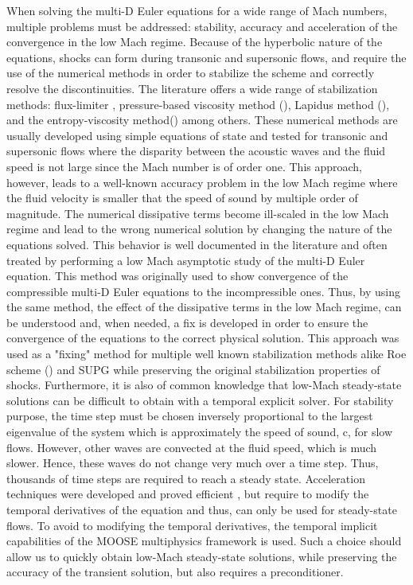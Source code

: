 When solving the multi-D Euler equations for a wide range of Mach numbers, multiple problems must be addressed: stability, accuracy and acceleration of the convergence in the low Mach regime. Because of the hyperbolic nature of the equations, shocks can form during transonic and supersonic flows, and require the use of the numerical methods in order to stabilize the scheme and correctly resolve the discontinuities. The literature offers a wide range of stabilization methods: flux-limiter \cite{FluxLimiter, FluxLimiter2}, pressure-based viscosity method (\cite{PBV_book}), Lapidus method (\cite{Lapidus_paper, LMP, Lapidus_book}), and the entropy-viscosity method(\cite{jlg1, jlg2}) among others. These numerical methods are usually developed using simple equations of state and tested for transonic and supersonic flows where the disparity between the acoustic waves and the fluid speed is not large since the Mach number is of order one. This approach, however, leads to a well-known accuracy problem in the low Mach regime where the fluid velocity is smaller that the speed of sound by multiple order of magnitude. The numerical dissipative terms become ill-scaled in the low Mach regime and lead to the wrong numerical solution by changing the nature of the equations solved. This behavior is well documented in the literature \cite{LowMach1, LowMach2, LowMach3} and often treated by performing a low Mach asymptotic study of the multi-D Euler equation. This method was originally used \cite{LowMach1} to show convergence of the compressible multi-D Euler equations to the incompressible ones. Thus, by using the same method, the effect of the dissipative terms in the low Mach regime, can be understood and, when needed, a fix is developed in order to ensure the convergence of the equations to the correct physical solution. This approach was used as a "fixing" method for multiple well known stabilization methods alike Roe scheme (\cite{Roe}) and SUPG \cite{LowMach3} while preserving the original stabilization properties of shocks. Furthermore, it is also of common knowledge that low-Mach steady-state solutions can be difficult to obtain with a temporal explicit solver. For stability purpose, the time step must be chosen inversely proportional to the largest eigenvalue of the system which is approximately the speed of sound, c, for slow flows. However, other waves are convected at the fluid speed, which is much slower. Hence, these waves do not change very much over a time step. Thus, thousands of time steps are required to reach a steady state. Acceleration techniques were developed and proved efficient \cite{LowMach2}, but require to modify the temporal derivatives of the equation and thus, can only be used for steady-state flows. To avoid to modifying the temporal derivatives, the temporal implicit capabilities of the MOOSE multiphysics framework \cite{Moose} is used. Such a choice should allow us to quickly obtain low-Mach steady-state solutions, while preserving the accuracy of the transient solution, but also requires a preconditioner.\\
